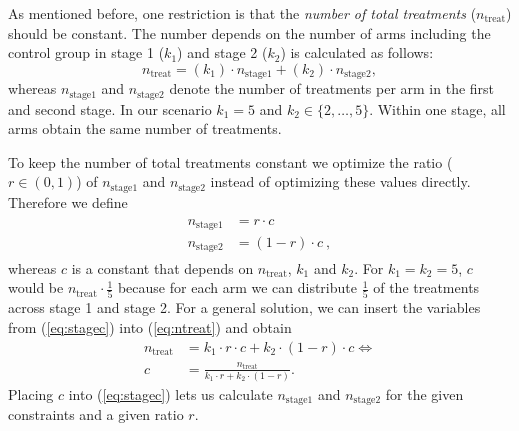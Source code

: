 \documentclass[bimj,fleqn]{w-art}
\theoremstyle{plain}
\theoremstyle{definition}
\begin{document}
As mentioned before, one restriction is that the \emph{number of total treatments} ($n_{\text{treat}}$) should be constant.
The number depends on the number of arms including the control group in stage 1 ($k_1$) and stage 2 ($k_2$) is calculated as follows:
\begin{equation}
  \label{eq:ntreat}
  n_{\text{treat}} = (k_1) \cdot n_{\text{stage1}} + (k_2) \cdot n_{\text{stage2}},
\end{equation}
whereas $n_{\text{stage1}}$ and $n_{\text{stage2}}$ denote the number of treatments per arm in the first and second stage.
In our scenario $k_1 = 5$ and $k_2 \in \{2, \ldots, 5\}$.
Within one stage, all arms obtain the same number of treatments.

To keep the number of total treatments constant we optimize the ratio ($r \in (0,1)$) of $n_{\text{stage1}}$ and $n_{\text{stage2}}$ instead of optimizing these values directly.
Therefore we define
\begin{align}
  \label{eq:stagec}
  \begin{split}
  n_{\text{stage1}} &= r \cdot c \\
  n_{\text{stage2}} &= (1-r) \cdot c \ ,
  \end{split}
\end{align}
whereas $c$ is a constant that depends on $n_{\text{treat}}$, $k_1$ and $k_2$.
For $k_1 = k_2 = 5$, $c$ would be $n_{\text{treat}} \cdot \frac{1}{5}$ because for each arm we can distribute $\frac{1}{5}$ of the treatments across stage 1 and stage 2.
For a general solution, we can insert the variables from (\ref{eq:stagec}) into (\ref{eq:ntreat}) and obtain
\begin{align}
  \label{eq:ntreatc}
  n_{\text{treat}} &= k_1 \cdot r \cdot c + k_2 \cdot (1-r) \cdot c \Leftrightarrow \\
  c &= \frac{n_{\text{treat}}}{k_1 \cdot r + k_2 \cdot (1-r)}.
\end{align}
Placing $c$ into (\ref{eq:stagec}) lets us calculate $n_{\text{stage1}}$ and $n_{\text{stage2}}$ for the given constraints and a given ratio $r$.
\end{document}
